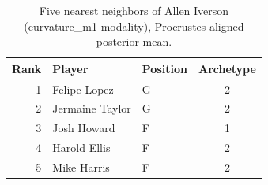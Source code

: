 \begin{table}[htbp]
  \centering\small
  \begin{tabular}{rllc}
    \toprule
    Rank & Player & Position & Archetype \\
    \midrule
    1 & Felipe Lopez & G & 2 \\
    2 & Jermaine Taylor & G & 2 \\
    3 & Josh Howard & F & 1 \\
    4 & Harold Ellis & F & 2 \\
    5 & Mike Harris & F & 2 \\
    \bottomrule
  \end{tabular}
  \caption{Five nearest neighbors of Allen Iverson (curvature_m1 modality), Procrustes-aligned posterior mean.}
  \label{tab:Allen_Iverson_neighbors_curvature_m1}
\end{table}

